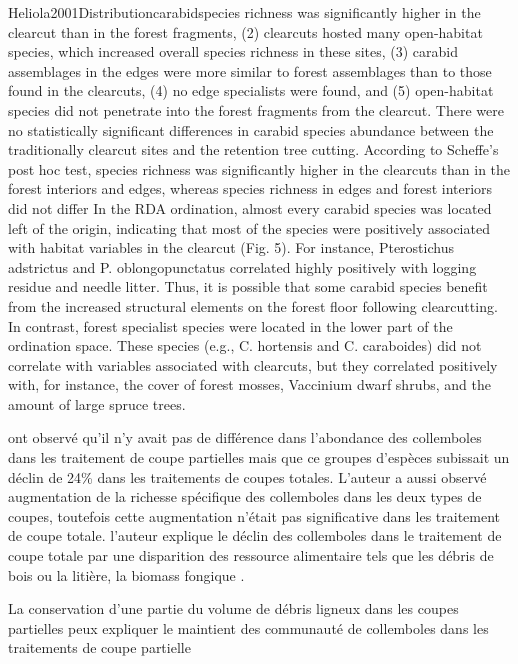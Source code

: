 Heliola2001Distributioncarabidspecies 
richness was significantly higher in the clearcut than in the forest fragments, (2) clearcuts hosted many open-habitat species, which increased overall species richness in these sites, (3) carabid assemblages in the edges were more similar to forest assemblages than to those found in the clearcuts, (4) no edge specialists were found, and (5) open-habitat species did not penetrate into the forest fragments from the clearcut.
There were no statistically significant differences in carabid species abundance between the traditionally clearcut sites and the retention tree cutting.
According to Scheffe’s post hoc test, species richness was significantly higher in the clearcuts than in the forest interiors and edges, whereas species richness in edges and forest interiors did not differ
In the RDA ordination, almost every carabid species was located left of the origin, indicating that most of the species were positively associated 
with habitat variables in the clearcut (Fig. 5). 
For instance, Pterostichus adstrictus and P. oblongopunctatus correlated highly positively with logging residue and needle litter. 
Thus, it is possible that some carabid species benefit from the increased structural elements on the forest floor following clearcutting. 
In contrast, forest specialist species were located in the lower part of the ordination space. These species (e.g., C. hortensis and C. caraboides) 
did not correlate with variables associated with clearcuts, but they correlated positively with, for instance, the cover of forest mosses, 
Vaccinium dwarf shrubs, and the amount of large spruce trees.

\cite{Kudrin2023metaanalysiseffects} ont observé qu'il n'y avait pas de différence dans l'abondance des collemboles dans les traitement de coupe partielles mais que ce groupes d'espèces subissait un déclin de 24\% dans les traitements de coupes totales.
L'auteur a aussi observé augmentation de la richesse spécifique des collemboles dans les deux types de coupes, toutefois cette augmentation n'était pas significative dans les traitement de coupe totale.
l'auteur explique le déclin des collemboles dans le traitement de coupe totale par une disparition des ressource alimentaire tels que les débris de bois ou la litière, la biomass fongique \citep{Baath1995Microbialcommunity}.

La conservation d'une partie du volume de débris ligneux dans les coupes partielles peux expliquer le maintient des communauté de collemboles dans les traitements de coupe partielle \citep{Raymond-Leonard2020Deadwood}


